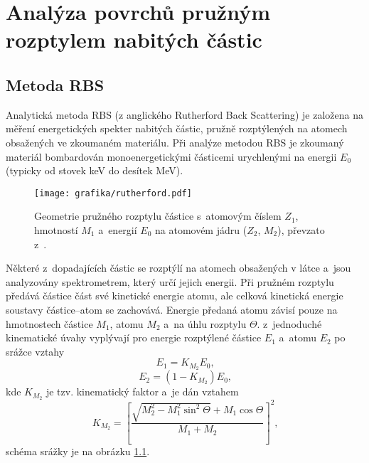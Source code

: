 \chapter{Analýza povrchů pružným rozptylem nabitých částic}
\section{Metoda RBS}
Analytická metoda RBS (z anglického Rutherford Back Scattering) je založena na měření energetických spekter nabitých částic, pružně rozptýlených na atomech obsažených ve zkoumaném materiálu. 
Při analýze metodou RBS je zkoumaný materiál bombardován monoenergetickými částicemi urychlenými na energii $E_0$ (typicky od stovek keV do desítek MeV). 

\begin{figure}[btp]
  \centering
  \texttt{[image: grafika/rutherford.pdf]}
  \caption{Geometrie pružného rozptylu částice s~atomovým číslem $Z_1$, hmotností $M_1$ a~energií $E_0$ na atomovém jádru ($Z_2$, $M_2$), převzato z~\cite{Kral2002}.}
  \label{rutherford}
\end{figure}

Některé z~dopadajících částic se rozptýlí na atomech obsažených v látce a~jsou analyzovány spektrometrem, který určí jejich energii. Při pružném rozptylu předává částice část své kinetické energie atomu, ale celková kinetická energie soustavy částice--atom se zachovává. Energie předaná atomu závisí pouze na hmotnostech částice $M_1$, atomu $M_2$ a~na úhlu rozptylu $\Theta$. z~jednoduché kinematické úvahy vyplývají pro energie rozptýlené částice $E_1$ a~atomu $E_2$ po srážce vztahy
%
\begin{equation}
E_1 = K_{M_2} E_0 \text{,}
\end{equation}
\begin{equation}
E_2 = (1 - K_{M_2}) E_0 \text{,}
\end{equation}  
%
kde $K_{M_2}$ je tzv. kinematický faktor a~je dán vztahem
\begin{equation}
K_{M_2} = \left[ \frac{\sqrt{M_2^2 - M_1^2\sin^2\Theta} + M_1 \cos\Theta}{M_1 + M_2} \right]^2 \text{,}
\end{equation}
schéma srážky je na obrázku \ref{rutherford}.

